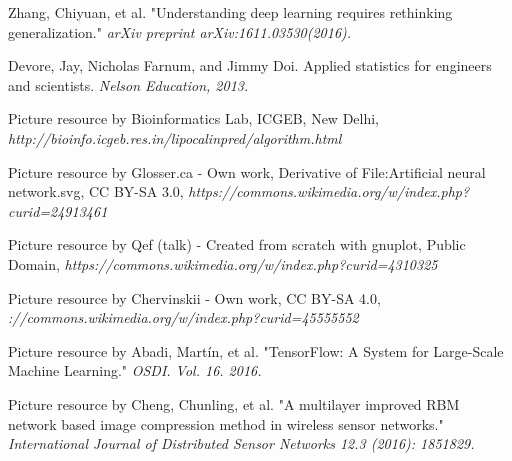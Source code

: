\documentclass[12pt]{report} %
\begin{document}
\begin{thebibliography}{}
	Zhang, Chiyuan, et al. "Understanding deep learning requires rethinking generalization." \textit{arXiv preprint arXiv:1611.03530(2016).}

	Devore, Jay, Nicholas Farnum, and Jimmy Doi. Applied statistics for engineers and scientists. \textit{Nelson Education, 2013.}

	Picture resource by Bioinformatics Lab, ICGEB, New Delhi,
	\textit{http://bioinfo.icgeb.res.in/lipocalinpred/algorithm.html}

	Picture resource by Glosser.ca - Own work, Derivative of File:Artificial neural network.svg, CC BY-SA 3.0, \textit{https://commons.wikimedia.org/w/index.php?curid=24913461}

	Picture resource by Qef (talk) - Created from scratch with gnuplot, Public Domain, \textit{https://commons.wikimedia.org/w/index.php?curid=4310325}

	Picture resource by Chervinskii - Own work, CC BY-SA 4.0,  \textit{://commons.wikimedia.org/w/index.php?curid=45555552}

	Picture resource by Abadi, Martín, et al. "TensorFlow: A System for Large-Scale Machine Learning." \textit{OSDI. Vol. 16. 2016.}

	Picture resource by Cheng, Chunling, et al. "A multilayer improved RBM network based image compression method in wireless sensor networks." \textit{International Journal of Distributed Sensor Networks 12.3 (2016): 1851829.}


\end{thebibliography}
\end{document}
